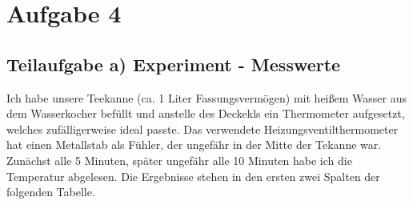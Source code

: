 \documentclass{article}
\begin{document}
\section*{Aufgabe 4}
\subsection*{Teilaufgabe a) Experiment - Messwerte}
Ich habe unsere Teekanne (ca. 1 Liter Fassungsvermögen) mit heißem Wasser aus dem Wasserkocher befüllt und anstelle des Deckekls ein Thermometer aufgesetzt, welches zufälligerweise ideal passte. 
Das verwendete Heizungsventilthermometer hat einen Metallstab als Fühler, der ungefähr in der Mitte der Tekanne war. 
Zunächst alle 5 Minuten, später ungefähr alle 10 Minuten habe ich die Temperatur abgelesen. Die Ergebnisse stehen in den ersten zwei Spalten der folgenden Tabelle.\\ 
\newpage
\end{document}
